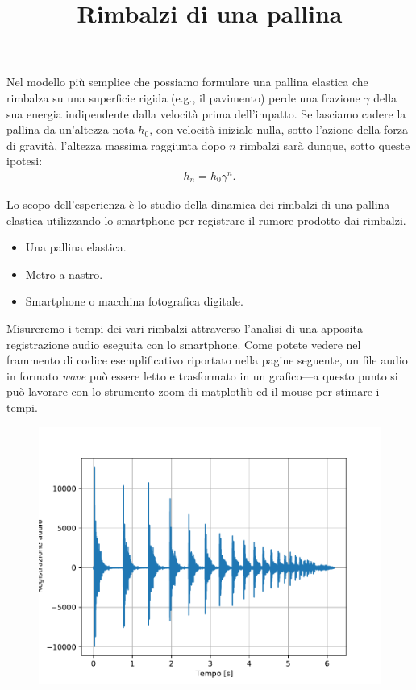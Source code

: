 \documentclass{lab1-article}
\title{Rimbalzi di una pallina}
\begin{document}
\begin{article}

\maketitle

\secintro

Nel modello pi\`u semplice che possiamo formulare una pallina elastica che
rimbalza su una superficie rigida (e.g., il pavimento) perde una frazione $\gamma$
della sua energia indipendente dalla velocit\`a prima dell'impatto. Se lasciamo
cadere la pallina da un'altezza nota $h_0$, con velocit\`a iniziale nulla, sotto
l'azione della forza di gravit\`a, l'altezza massima raggiunta dopo $n$ rimbalzi
sar\`a dunque, sotto queste ipotesi:
\begin{align}\label{eq:modello}
  h_n = h_0 \gamma^n.
\end{align}

Lo scopo dell'esperienza \`e lo studio della dinamica dei rimbalzi di una
pallina elastica utilizzando lo smartphone per registrare il rumore prodotto dai
rimbalzi.

\secmaterialsdad

\begin{itemize}
\item Una pallina elastica.
\item Metro a nastro.
\item Smartphone o macchina fotografica digitale.
\end{itemize}


\secmeasurements

Misureremo i tempi dei vari rimbalzi attraverso l'analisi di una apposita
registrazione audio eseguita con lo smartphone. Come potete vedere nel
frammento di codice esemplificativo riportato nella pagine seguente,
un file audio in formato \emph{wave} pu\`o essere letto e trasformato in un
grafico---a questo punto si pu\`o lavorare con lo strumento zoom di matplotlib
ed il mouse per stimare i tempi.

\begin{figure}[!hb]
  \includegraphics[width=\linewidth]{figures/rimbalzi_palla}
\end{figure}


\end{article}
\end{document}
